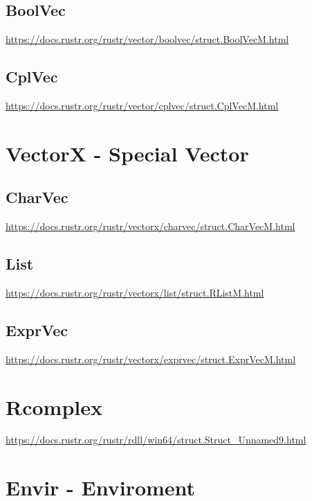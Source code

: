 \documentclass[]{book}
\begin{document}
\subsection{BoolVec}\label{boolvec}

\url{https://docs.rustr.org/rustr/vector/boolvec/struct.BoolVecM.html}

\subsection{CplVec}\label{cplvec}

\url{https://docs.rustr.org/rustr/vector/cplvec/struct.CplVecM.html}

\section{VectorX - Special Vector}\label{vectorx---special-vector}

\subsection{CharVec}\label{charvec}

\url{https://docs.rustr.org/rustr/vectorx/charvec/struct.CharVecM.html}

\subsection{List}\label{list}

\url{https://docs.rustr.org/rustr/vectorx/list/struct.RListM.html}

\subsection{ExprVec}\label{exprvec}

\url{https://docs.rustr.org/rustr/vectorx/exprvec/struct.ExprVecM.html}

\section{Rcomplex}\label{rcomplex}

\url{https://docs.rustr.org/rustr/rdll/win64/struct.Struct_Unnamed9.html}

\section{Envir - Enviroment}\label{envir---enviroment}
\end{document}
